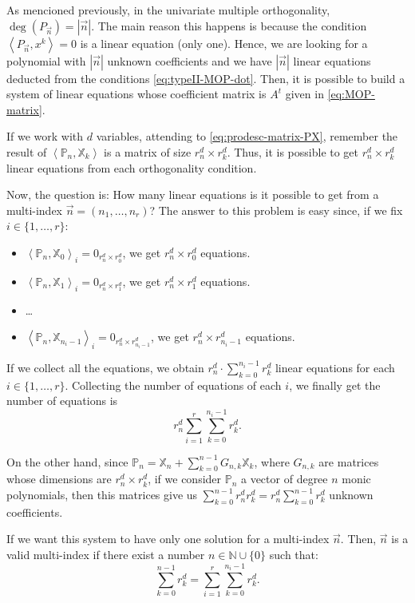 \documentclass[12pt,a4]{article}
\theoremstyle{plain}
\newcommand{\N}[0]{\mathbb{N}}
\newcommand{\prodesc}[2]{\left\langle #1 , #2 \right\rangle}
\begin{document}
As mencioned previously, in the univariate multiple orthogonality, $\deg(P_{\vec n})=|\vec n|$. The main reason this happens is because the condition $\prodesc{P_{\vec n}}{x^k}=0$ is a linear equation (only one). Hence, we are looking for a polynomial with $|\vec n|$ unknown coefficients and we have $|\vec n|$ linear equations deducted from the conditions \eqref{eq:typeII-MOP-dot}. Then, it is possible to build a system of linear equations whose coefficient matrix is $A^t$ given in \eqref{eq:MOP-matrix}.

If we work with $d$ variables, attending to \eqref{eq:prodesc-matrix-PX}, remember the result of $\prodesc{\mathbb P_n}{\mathbb X_k}$ is a matrix of size $r_n^d\times r_k^d$. Thus, it is possible to get $r_n^d\times r_k^d$ linear equations from each orthogonality condition.  

Now, the question is: How many linear equations is it possible to get from a multi-index $\vec n =(n_1, \dots, n_r)$? The answer to this problem is easy since, if we fix $i\in\{1,\dots,r\}$:
\begin{itemize}
    \item $\prodesc{\mathbb P_n}{\mathbb X_0}_i = 0_{r^d_n\times r^d_0}$, we get $r^d_n\times r^d_0$ equations.
    \item $\prodesc{\mathbb P_n}{\mathbb X_1}_i = 0_{r^d_n\times r^d_1}$, we get $r^d_n\times r^d_1$ equations.
    \item \dots
    \item $\prodesc{\mathbb P_n}{\mathbb X_{n_i-1}}_i = 0_{r^d_n\times r^d_{n_i-1}}$, we get $r^d_n\times r^d_{n_i-1}$ equations.
\end{itemize} 
If we collect all the equations, we obtain $r_n^d\cdot\displaystyle\sum_{k=0}^{n_i-1}r^d_k$ linear equations for each $i\in\{1,\dots,r\}$. Collecting the number of equations of each $i$, we finally get the number of equations is 
\begin{equation}
    \label{eq:number-eqs}
    r_n^d \sum_{i=1}^r \sum_{k=0}^{n_i-1} r_k^d.
\end{equation}

On the other hand, since $\mathbb P_n = \mathbb X_n + \displaystyle\sum_{k=0}^{n-1}G_{n,k} \mathbb X_k$, where $G_{n,k}$ are matrices whose dimensions are $r^d_n\times r^d_k$, if we consider $\mathbb P_n$ a vector of degree $n$ monic polynomials, then this matrices give us $\displaystyle\sum_{k=0}^{n-1}r^d_n r^d_k=r^d_n\displaystyle\sum_{k=0}^{n-1} r^d_k$ unknown coefficients.

If we want this system to have only one solution for a multi-index $\vec n$. Then, $\vec n$ is a valid multi-index if there exist a number $n\in\N\cup\{0\}$ such that:
\begin{equation}
    \label{eq:condition-type-ii-general}
    \displaystyle\sum_{k=0}^{n-1} r^d_k = \sum_{i=1}^r \sum_{k=0}^{n_i-1} r_k^d.
\end{equation}
\end{document}
